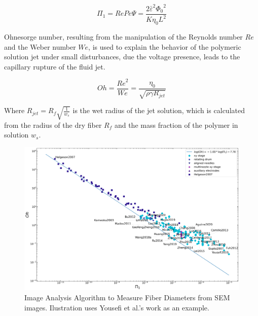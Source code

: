 \begin{equation}\label{eqn:electroViscousRatio}
    \Pi_1 = Re Pe \Psi = \frac{2 {\bar{\varepsilon}}^2 {\Phi_0}^2}{K \eta_0 L^2}
\end{equation}

Ohnesorge number, resulting from the manipulation of the Reynolds number $Re$ and the Weber number $We$, is used to explain the behavior of the polymeric solution jet under small disturbances, due the voltage presence, leads to the capillary rupture of the fluid jet. \cite{Helgeson2007}

\begin{equation}\label{eqn:ohnesorgeNumber}
    Oh = \frac{{Re}^2}{We} = \frac{\eta_0}{\sqrt{\rho \gamma R_{jet}}}
\end{equation}

Where $ \displaystyle R_{jet} = R_f \sqrt{\frac{1}{w_s}} $ is the wet radius of the jet solution, which is calculated from the radius of the dry fiber $R_f$ and the mass fraction of the polymer in solution $w_s$. \cite{Helgeson2007}

\begin{figure}[!th]
\centering
\includegraphics[width=\textwidth]{./Figures/plt_Pi1_vs_Oh.png}
\decoRule
\caption[Image Analysis Algorithm to Measure Fiber Diameters from SEM images]{Image Analysis Algorithm to Measure Fiber Diameters from SEM images. Ilustration uses Yousefi et al.'s work as an example. \cite{Helgeson2007,
  Yang2019,Fattahi2017,Shin2019,Wang2015,Parajuli2016,Zheng2010,Fuh2011,Dalton2015,
  Ru2014,Xue2014,Wang2017,Xu2014,Liu2013,Pan2014,Canton2014,Chakraborty2009,Gupta2007,
  He2018,Zhou2011,Chen2013,Williams2018,Choi2017,Pan2019,Lei2015,Lim2019,Park2020,
  Fuh2012,Flores2017,Chang2010,Xu2019,Zhang2019,Shin2018,Fuh2015,Nagle2019,Zheng2012,
  Kameoka2003a,Liu2014,E.King2019,Hochleitner2017,Madou2011,Jiang2018,Husain2016,
  ElectrospinTech2015,Brown2011,Kolan2018,Chang2011,Beachley2011,Camillo2013,Kameoka2003,
  Bu2012,Lee2012,Huang2015,Coppola2020,CisquellaSerra2019,Ruggieri2013,Hochleitner2014,
  Zhu2016,Brown2014,Chang2008,Sonntag2020,Kim2018,Deng2020,Han2019,George2020,Sun2006a,
  Pan2015,Shen2016,Strauss2019,Fuh2013,Sarkar2007,You2017,Wang2018a,Zheng2014,Song2015,
  GaofengZheng2010,Liu2015a,Min2013,Luo2016,Yousefi2019,Cardenas2017,Coppola2014}}
\label{fig:plt_Pi1_vs_Oh}
\end{figure}

